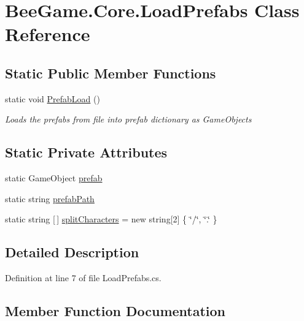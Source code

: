 \hypertarget{class_bee_game_1_1_core_1_1_load_prefabs}{}\section{Bee\+Game.\+Core.\+Load\+Prefabs Class Reference}
\label{class_bee_game_1_1_core_1_1_load_prefabs}
\subsection*{Static Public Member Functions}
\begin{DoxyCompactItemize}
\item 
static void \hyperlink{class_bee_game_1_1_core_1_1_load_prefabs_ae6045dba0f7f8bad5a1256ff46747614}{Prefab\+Load} ()
\begin{DoxyCompactList}\small\item\em Loads the prefabs from file into prefab dictionary as Game\+Objects \end{DoxyCompactList}\end{DoxyCompactItemize}
\subsection*{Static Private Attributes}
\begin{DoxyCompactItemize}
\item 
static Game\+Object \hyperlink{class_bee_game_1_1_core_1_1_load_prefabs_ac87d57b130a1b2542a3327a56b429f68}{prefab}
\item 
static string \hyperlink{class_bee_game_1_1_core_1_1_load_prefabs_a0f61e1d478ea8953fc4cfa5fa4a59b90}{prefab\+Path}
\item 
static string \mbox{[}$\,$\mbox{]} \hyperlink{class_bee_game_1_1_core_1_1_load_prefabs_a774463c4978def7fe0052c4ed1b46549}{split\+Characters} = new string\mbox{[}2\mbox{]} \{ \char`\"{}/\char`\"{}, \char`\"{}.\char`\"{} \}
\end{DoxyCompactItemize}


\subsection{Detailed Description}


Definition at line 7 of file Load\+Prefabs.\+cs.



\subsection{Member Function Documentation}
\mbox{\label{class_bee_game_1_1_core_1_1_load_prefabs_ae6045dba0f7f8bad5a1256ff46747614}} 

